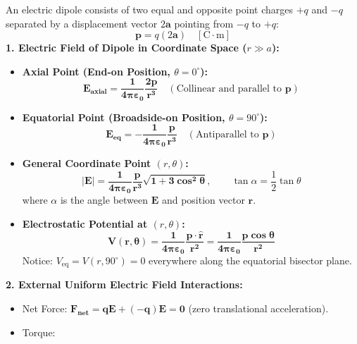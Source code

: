 \documentclass[10pt,twoside,openright]{book}
\begin{document}
\begin{formulabox}
An electric dipole consists of two equal and opposite point charges $+q$ and $-q$ separated by a displacement vector $2\mathbf{a}$ pointing from $-q$ to $+q$:
\begin{equation}
  \mathbf{p} = q(2\mathbf{a}) \quad [\mathrm{C}\cdot\mathrm{m}]
\end{equation}
\textbf{1. Electric Field of Dipole in Coordinate Space ($r \gg a$):}
\begin{itemize}
  \item \textbf{Axial Point (End-on Position, $\theta = 0^\circ$):}
  \begin{equation}
    \mathbf{E_{\text{axial}} = \frac{1}{4\pi\varepsilon_0} \frac{2\mathbf{p}}{r^3}} \quad (\text{Collinear and parallel to } \mathbf{p})
  \end{equation}
  \item \textbf{Equatorial Point (Broadside-on Position, $\theta = 90^\circ$):}
  \begin{equation}
    \mathbf{E_{\text{eq}} = -\frac{1}{4\pi\varepsilon_0} \frac{\mathbf{p}}{r^3}} \quad (\text{Antiparallel to } \mathbf{p})
  \end{equation}
  \item \textbf{General Coordinate Point $(r, \theta)$:}
  \begin{equation}
    \mathbf{|\mathbf{E}| = \frac{1}{4\pi\varepsilon_0} \frac{p}{r^3} \sqrt{1 + 3\cos^2\theta}}, \qquad \tan\alpha = \frac{1}{2}\tan\theta
  \end{equation}
  where $\alpha$ is the angle between $\mathbf{E}$ and position vector $\mathbf{r}$.
  \item \textbf{Electrostatic Potential at $(r, \theta)$:}
  \begin{equation}
    \mathbf{V(r, \theta) = \frac{1}{4\pi\varepsilon_0} \frac{\mathbf{p}\cdot\hat{\mathbf{r}}}{r^2} = \frac{1}{4\pi\varepsilon_0} \frac{p\cos\theta}{r^2}}
  \end{equation}
  Notice: $V_{\text{eq}} = V(r, 90^\circ) = 0$ everywhere along the equatorial bisector plane.
\end{itemize}
\textbf{2. External Uniform Electric Field Interactions:}
\begin{itemize}
  \item Net Force: $\mathbf{F_{\text{net}} = q\mathbf{E} + (-q)\mathbf{E} = 0}$ (zero translational acceleration).
  \item Torque:
  \begin{equation}

\end{equation}
\end{itemize}
\end{formulabox}
\end{document}
